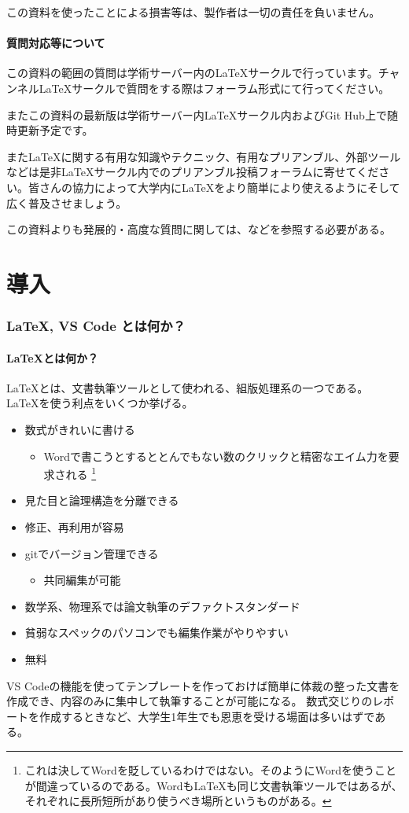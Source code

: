 \documentclass[titlepage]{ltjsarticle}
\begin{document}
この資料を使ったことによる損害等は、製作者は一切の責任を負いません。

\subsection{質問対応等について}

この資料の範囲の質問は学術サーバー内のLaTeXサークルで行っています。チャンネルLaTeXサークルで質問をする際はフォーラム形式にて行ってください。

またこの資料の最新版は学術サーバー内LaTeXサークル内およびGit Hub上で随時更新予定です。

また\LaTeX に関する有用な知識やテクニック、有用なプリアンブル、外部ツールなどは是非LaTeXサークル内でのプリアンブル投稿フォーラムに寄せてください。皆さんの協力によって大学内に\LaTeX をより簡単により使えるようにそして広く普及させましょう。

この資料よりも発展的・高度な質問に関しては、\cite{TeXwiki-home}などを参照する必要がある。
\clearpage
\tableofcontents
\clearpage

\part{導入}
\section{\LaTeX , VS Code とは何か？}
\subsection{\LaTeX とは何か？}
\LaTeX とは、文書執筆ツールとして使われる、組版処理系の一つである。
\LaTeX を使う利点をいくつか挙げる。
\begin{itemize}
  \item 数式がきれいに書ける
        \begin{itemize}
          \item Wordで書こうとするととんでもない数のクリックと精密なエイム力を要求される
                \footnote{これは決してWordを貶しているわけではない。そのようにWordを使うことが間違っているのである。Wordも\LaTeX も同じ文書執筆ツールではあるが、それぞれに長所短所があり使うべき場所というものがある。}
        \end{itemize}
  \item 見た目と論理構造を分離できる
  \item 修正、再利用が容易
  \item gitでバージョン管理できる
        \begin{itemize}
          \item 共同編集が可能
        \end{itemize}
  \item 数学系、物理系では論文執筆のデファクトスタンダード
  \item 貧弱なスペックのパソコンでも編集作業がやりやすい
  \item 無料
\end{itemize}
VS Codeの機能を使ってテンプレートを作っておけば簡単に体裁の整った文書を作成でき、内容のみに集中して執筆することが可能になる。
数式交じりのレポートを作成するときなど、大学生1年生でも恩恵を受ける場面は多いはずである。
\end{document}
